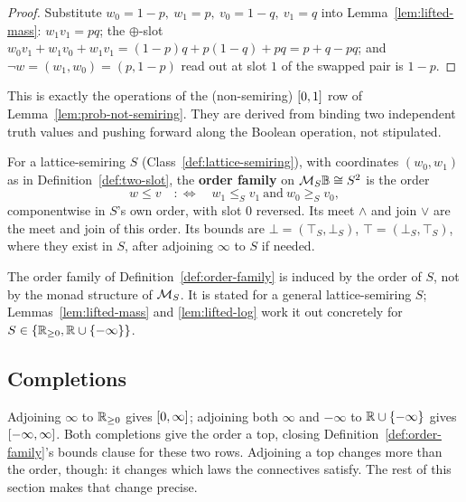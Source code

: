\begin{proof}
\leanok
Substitute $w_0=1-p,\ w_1=p,\ v_0=1-q,\ v_1=q$ into
Lemma~\ref{lem:lifted-mass}: $w_1v_1=pq$; the $\oplus$-slot
$w_0v_1+w_1v_0+w_1v_1 = (1-p)q+p(1-q)+pq = p+q-pq$; and
$\neg w = (w_1,w_0)=(p,1-p)$ read out at slot $1$ of the swapped pair
is $1-p$.
\end{proof}

This is exactly the operations of the (non-semiring) $[0,1]$ row of
Lemma~\ref{lem:prob-not-semiring}. They are derived from binding two
independent truth values and pushing forward along the Boolean
operation, not stipulated.

\begin{definition}
\label{def:order-family}
\leanok
For a lattice-semiring $S$ (Class~\ref{def:lattice-semiring}), with
coordinates $(w_0,w_1)$ as in Definition~\ref{def:two-slot}, the
\textbf{order family} on $\mathcal M_{S}\mathbb B \cong S^2$ is the order
\[
  w \le v \quad :\iff \quad w_1 \le_S v_1 \ \text{and}\ w_0 \ge_S v_0,
\]
componentwise in $S$'s own order, with slot $0$ reversed. Its meet
$\wedge$ and join $\vee$ are the meet and join of this order. Its
bounds are $\bot = (\top_S, \bot_S)$, $\top = (\bot_S, \top_S)$, where
they exist in $S$, after adjoining $\infty$ to $S$ if needed.
\end{definition}

The order family of Definition~\ref{def:order-family} is induced by
the order of $S$, not by the monad structure of $\mathcal M_{S}$. It is stated
for a general lattice-semiring $S$; Lemmas~\ref{lem:lifted-mass} and
\ref{lem:lifted-log} work it out concretely for $S \in \{\mathbb R_{\ge 0},
\mathbb R \cup \{-\infty\}\}$.

\subsection{Completions}  %
\label{sec:completions}

Adjoining $\infty$ to $\mathbb R_{\ge 0}$ gives $[0,\infty]$; adjoining both
$\infty$ and $-\infty$ to $\mathbb R \cup \{-\infty\}$ gives $[-\infty,\infty]$. Both completions
give the order a top, closing Definition~\ref{def:order-family}'s
bounds clause for these two rows. Adjoining a top changes more than
the order, though: it changes which laws the connectives satisfy. The
rest of this section makes that change precise.

